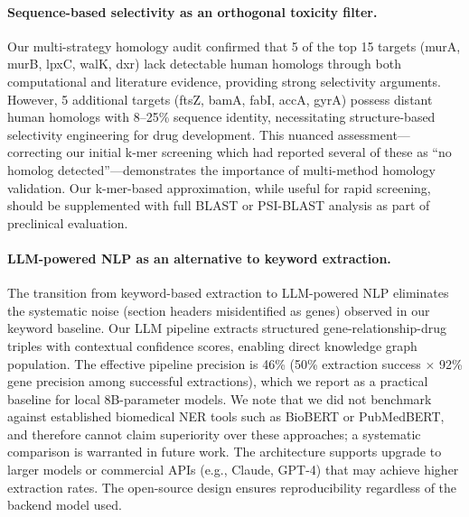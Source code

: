 \documentclass[12pt,a4paper]{article}
\begin{document}
\paragraph{Sequence-based selectivity as an orthogonal toxicity filter.}
Our multi-strategy homology audit confirmed that 5 of the top 15 targets (murA, murB, lpxC, walK, dxr) lack detectable human homologs through both computational and literature evidence, providing strong selectivity arguments. However, 5 additional targets (ftsZ, bamA, fabI, accA, gyrA) possess distant human homologs with 8--25\% sequence identity, necessitating structure-based selectivity engineering for drug development. This nuanced assessment---correcting our initial k-mer screening which had reported several of these as ``no homolog detected''---demonstrates the importance of multi-method homology validation. Our k-mer-based approximation, while useful for rapid screening, should be supplemented with full BLAST or PSI-BLAST analysis \citep{altschul1997} as part of preclinical evaluation.

\paragraph{LLM-powered NLP as an alternative to keyword extraction.}
The transition from keyword-based extraction to LLM-powered NLP eliminates the systematic noise (section headers misidentified as genes) observed in our keyword baseline. Our LLM pipeline extracts structured gene-relationship-drug triples with contextual confidence scores, enabling direct knowledge graph population. The effective pipeline precision is 46\% (50\% extraction success $\times$ 92\% gene precision among successful extractions), which we report as a practical baseline for local 8B-parameter models. We note that we did not benchmark against established biomedical NER tools such as BioBERT \citep{lee2020} or PubMedBERT, and therefore cannot claim superiority over these approaches; a systematic comparison is warranted in future work. The architecture supports upgrade to larger models or commercial APIs (e.g., Claude, GPT-4) that may achieve higher extraction rates. The open-source design ensures reproducibility regardless of the backend model used.
\end{document}
